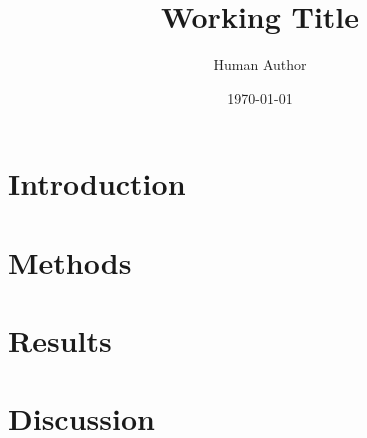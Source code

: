 \documentclass[
  aps,
  pra,
  onecolumn,
  superscriptaddress,
  longbibliography
]{revtex4-2}
\begin{document}
\nocite{apsrev42Control}

\title{Working Title}
\author{Human Author}
\date{\today}

\begin{abstract}
\end{abstract}

\maketitle

\section{Introduction}

\section{Methods}

\section{Results}

\section{Discussion}



\end{document}
